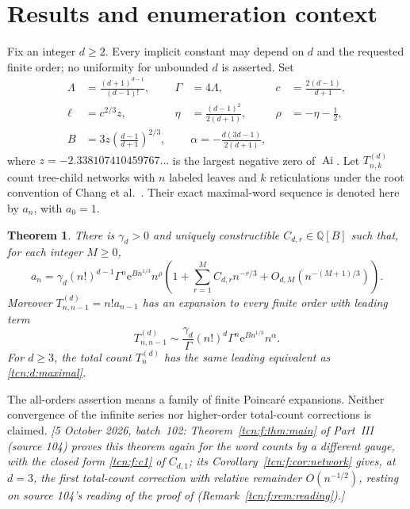 \documentclass[11pt,letterpaper]{article}
\newcommand{\Ai}{\operatorname{Ai}}
\newcommand{\ee}{\mathrm e}
\newtheorem{theorem}{Theorem}[section]
\theoremstyle{remark}
\begin{document}
\section{Results and enumeration context}\label{tcn:d:sec:results}
Fix an integer $d\ge2$. Every implicit constant may depend on $d$ and the requested finite order; no uniformity for unbounded $d$ is asserted. Set
\begin{align}
 \Lambda&=\frac{(d+1)^{d-1}}{(d-1)!},& \Gamma&=4\Lambda,
 &c&=\frac{2(d-1)}{d+1},\\
 \ell&=c^{2/3}z,&\eta&=\frac{(d-1)^2}{2(d+1)},
 &\rho&=-\eta-\frac12,\\
 B&=3z\left(\frac{d-1}{d+1}\right)^{2/3},&&
 \alpha=-\frac{d(3d-1)}{2(d+1)},
\end{align}
where $z=-2.338107410459767\ldots$ is the largest negative zero of $\Ai$.
Let $T_{n,k}^{(d)}$ count tree-child networks with $n$ labeled leaves and $k$ reticulations under the root convention of Chang et al.\ \cite{Chang2024}. Their exact maximal-word sequence is denoted here by $a_n$, with $a_0=1$.

\begin{theorem}\label{tcn:d:main}
There is $\gamma_d>0$ and uniquely constructible $C_{d,r}\in\mathbb Q[B]$ such that, for each integer $M\ge0$,
\begin{equation}\label{tcn:d:forward}
 a_n=\gamma_d(n!)^{d-1}\Gamma^n\ee^{Bn^{1/3}}n^\rho
 \left(1+\sum_{r=1}^M C_{d,r}n^{-r/3}
       +O_{d,M}(n^{-(M+1)/3})\right).
\end{equation}
Moreover $T_{n,n-1}^{(d)}=n!a_{n-1}$ has an expansion to every finite order with leading term
\begin{equation}\label{tcn:d:maximal}
 T_{n,n-1}^{(d)}\sim\frac{\gamma_d}{\Gamma}(n!)^d\Gamma^n
          \ee^{Bn^{1/3}}n^\alpha.
\end{equation}
For $d\ge3$, the total count $T_n^{(d)}$ has the same leading equivalent as \eqref{tcn:d:maximal}.
\end{theorem}
The all-orders assertion means a family of finite Poincar\'e expansions. Neither convergence of the infinite series nor higher-order total-count corrections is claimed.
\emph{[5 October 2026, batch~102: Theorem~\ref{tcn:f:thm:main} of Part~III (source 104) proves this theorem again for the word counts by a different gauge, with the closed form \eqref{tcn:f:c1} of $C_{d,1}$; its Corollary~\ref{tcn:f:cor:network} gives, at $d=3$, the first total-count correction with relative remainder $O(n^{-1/2})$, resting on source 104's reading of the proof of \cite[Lemma 3.24]{Chang2024} (Remark~\ref{tcn:f:rem:reading}).]}
\end{document}
